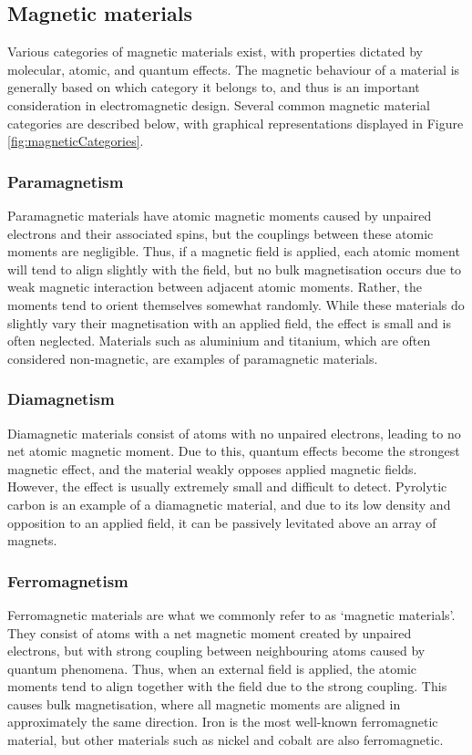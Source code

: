 \subsection{Magnetic materials}
Various categories of magnetic materials exist, with properties dictated by molecular, atomic, and quantum effects. The magnetic behaviour of a material is generally based on which category it belongs to, and thus is an important consideration in electromagnetic design. Several common magnetic material categories are described below, with graphical representations displayed in Figure \ref{fig:magneticCategories}.

\subsubsection{Paramagnetism}
Paramagnetic materials have atomic magnetic moments caused by unpaired electrons and their associated spins, but the couplings between these atomic moments are negligible. Thus, if a magnetic field is applied, each atomic moment will tend to align slightly with the field, but no bulk magnetisation occurs due to weak magnetic interaction between adjacent atomic moments. Rather, the moments tend to orient themselves somewhat randomly. While these materials do slightly vary their magnetisation with an applied field, the effect is small and is often neglected. Materials such as aluminium and titanium, which are often considered non-magnetic, are examples of paramagnetic materials.

\subsubsection{Diamagnetism}
Diamagnetic materials consist of atoms with no unpaired electrons, leading to no net atomic magnetic moment. Due to this, quantum effects become the strongest magnetic effect, and the material weakly opposes applied magnetic fields. However, the effect is usually extremely small and difficult to detect. Pyrolytic carbon is an example of a diamagnetic material, and due to its low density and opposition to an applied field, it can be passively levitated above an array of magnets.

\subsubsection{Ferromagnetism}
Ferromagnetic materials are what we commonly refer to as `magnetic materials'. They consist of atoms with a net magnetic moment created by unpaired electrons, but with strong coupling between neighbouring atoms caused by quantum phenomena. Thus, when an external field is applied, the atomic moments tend to align together with the field due to the strong coupling. This causes bulk magnetisation, where all magnetic moments are aligned in approximately the same direction. Iron is the most well-known ferromagnetic material, but other materials such as nickel and cobalt are also ferromagnetic.

